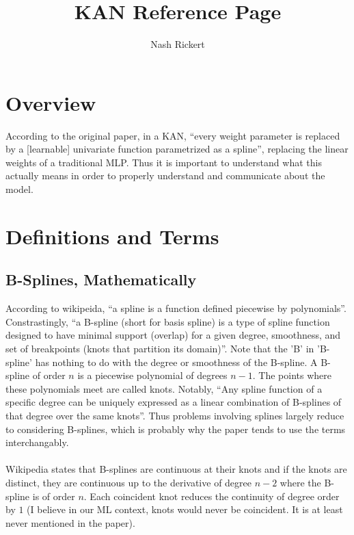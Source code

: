 \documentclass{article}
\title{KAN Reference Page}
\author{Nash Rickert}
\begin{document}
\maketitle

\section{Overview}
According to the original paper, in a KAN, ``every weight parameter is replaced by a [learnable] univariate function parametrized as a spline'', replacing the linear weights of a traditional MLP. Thus it is important to understand what this actually means in order to properly understand and communicate about the model.

\section{Definitions and Terms}

\subsection{B-Splines, Mathematically}
According to wikipeida, ``a spline is a function defined piecewise by polynomials''. Constrastingly, ``a B-spline (short for basis spline) is a type of spline function designed to have minimal support (overlap) for a given degree, smoothness, and set of breakpoints (knots that partition its domain)''. Note that the 'B' in 'B-spline' has nothing to do with the degree or smoothness of the B-spline. A B-spline of order $n$ is a piecewise polynomial of degrees $n - 1$. The points where these polynomials meet are called knots. Notably, ``Any spline function of a specific degree can be uniquely expressed as a linear combination of B-splines of that degree over the same knots''. Thus problems involving splines largely reduce to considering B-splines, which is probably why the paper tends to use the terms interchangably.\\\\
Wikipedia states that B-splines are continuous at their knots and if the knots are distinct, they are continuous up to the derivative of degree $n - 2$ where the B-spline is of order $n$. Each coincident knot reduces the continuity of degree order by $1$ (I believe in our ML context, knots would never be coincident. It is at least never mentioned in the paper).
\end{document}
